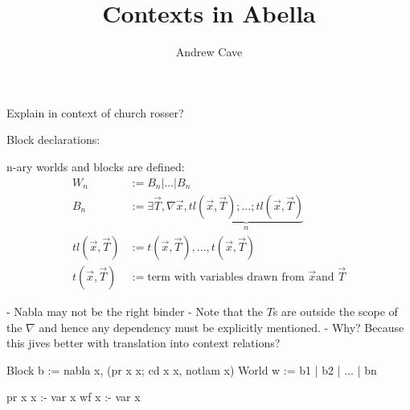 \documentclass{article}
\title{Contexts in Abella}
\author{Andrew Cave}
\begin{document}
\maketitle
Explain in context of church rosser?

Block declarations:

n-ary worlds and blocks are defined: 
\begin{align*}
W_n &:= B_n | ... | B_n \\
B_n &:= \exists \vec{T}, \nabla \vec{x}, \underbrace{tl(\vec{x}, \vec{T}); ...;
tl(\vec{x}, \vec{T})}_{n} \\
tl(\vec{x}, \vec{T}) &:= t(\vec{x}, \vec{T}), ..., t(\vec{x}, \vec{T}) \\
t(\vec{x}, \vec{T}) &:= \text{term with variables drawn from } \vec{x} \text{
  and } \vec{T}
\end{align*}

- Nabla may not be the right binder
- Note that the $T$s are outside the scope of the $\nabla$ and hence
any dependency must be explicitly mentioned.
- Why? Because this jives better with translation into context relations? 

Block b := nabla x, (pr x x; cd x x, notlam x)
World w := b1 | b2 | ... | bn

pr x x :- var x
wf x :- var x
\end{document}
